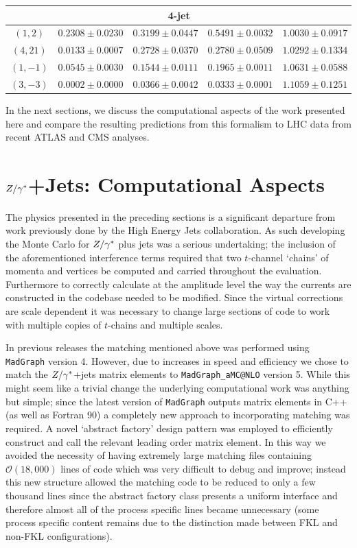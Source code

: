 \begin{table}[hbt]
\begin{tabular}{c|c|c|c|c}
	\multicolumn{5}{c}{4-jet} \\ \hline
	$(1, 2)$   &    $0.2308 \pm 0.0230$ &   $0.3199 \pm 0.0447$ &    $0.5491 \pm 0.0032$ &    $1.0030 \pm 0.0917$ \\
	$(4, 21)$  &    $0.0133 \pm 0.0007$ &   $0.2728 \pm 0.0370$ &    $0.2780 \pm 0.0509$ &    $1.0292 \pm 0.1334$ \\
	$(1,-1)$   &    $0.0545 \pm 0.0030$ &   $0.1544 \pm 0.0111$ &    $0.1965 \pm 0.0011$ &    $1.0631 \pm 0.0588$ \\
	$(3,-3)$   &    $0.0002 \pm 0.0000$ &   $0.0366 \pm 0.0042$ &    $0.0333 \pm 0.0001$ &    $1.1059 \pm 0.1251$ \\ \hline
	\end{tabular}
	\end{table}

	In the next sections, we discuss the computational aspects
	of the work presented here and compare the resulting predictions from this formalism
	to LHC data from recent ATLAS and CMS analyses.

\section{$Z/\gamma^*$+Jets: Computational Aspects}
	\label{sec:comp}

	The physics presented in the preceding sections is a significant departure from
	work previously done by the High Energy Jets collaboration.  As such developing
	the Monte Carlo for $Z/\gamma^*$ plus jets was a serious undertaking; the inclusion of
	the aforementioned interference terms required that two $t$-channel `chains' of
	momenta and vertices be computed and carried throughout the evaluation.
	Furthermore to correctly calculate at the amplitude level the way the \hej currents
	are constructed in the codebase needed to be modified.  Since the virtual corrections
	are scale dependent it was necessary to change large sections of code to work with
	multiple copies of $t$-chains and multiple scales.

	In previous \HEJ releases the matching mentioned above was performed using
	\texttt{MadGraph} version 4.  However, due to increases in speed and efficiency
	we chose to match the $Z/\gamma^*$+jets \HEJ matrix elements to \texttt{MadGraph\_aMC@NLO} version 5.
	While this might seem like a trivial change the underlying computational work
	was anything but simple; since the latest version of \texttt{MadGraph} outputs
	matrix elements in C++ (as well as Fortran 90) a completely new approach
	to incorporating matching was required.  A novel `abstract factory' design pattern
	was employed to efficiently construct and call the relevant leading order
	matrix element.  In this way we avoided the necessity of having extremely large
	matching files containing $\mathcal{O}(18,000)$ lines of code which was very difficult to
	debug and improve; instead this new structure allowed the matching code to
	be reduced to only a few thousand lines since the abstract factory class
	presents a uniform interface and therefore almost all of the process specific
	lines became unnecessary (some process specific content remains due to the
	distinction made between FKL and non-FKL configurations).


